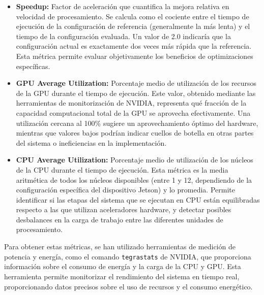 \documentclass[11pt,spanish,listoffigures,listoftables]{tfgetsinf}
\begin{document}
\begin{itemize}
      \item \textbf{Speedup:} Factor de aceleración que cuantifica la mejora relativa en velocidad de procesamiento. Se calcula como el cociente entre el tiempo de ejecución de la configuración de referencia (generalmente la más lenta) y el tiempo de la configuración evaluada. Un valor de 2.0 indicaría que la configuración actual es exactamente dos veces más rápida que la referencia. Esta métrica permite evaluar objetivamente los beneficios de optimizaciones específicas.

      \item \textbf{GPU Average Utilization:} Porcentaje medio de utilización de los recursos de la GPU durante el tiempo de ejecución. Este valor, obtenido mediante las herramientas de monitorización de NVIDIA, representa qué fracción de la capacidad computacional total de la GPU se aprovecha efectivamente. Una utilización cercana al 100\% sugiere un aprovechamiento óptimo del hardware, mientras que valores bajos podrían indicar cuellos de botella en otras partes del sistema o ineficiencias en la implementación.
      
      \item \textbf{CPU Average Utilization:} Porcentaje medio de utilización de los núcleos de la CPU durante el tiempo de ejecución. Esta métrica es la media aritmética de todos los núcleos disponibles (entre 1 y 12, dependiendo de la configuración específica del dispositivo Jetson) y lo promedia. Permite identificar si las etapas del sistema que se ejecutan en CPU están equilibradas respecto a las que utilizan aceleradores hardware, y detectar posibles desbalances en la carga de trabajo entre las diferentes unidades de procesamiento.

\end{itemize}


Para obtener estas métricas, se han utilizado herramientas de medición de potencia y energía, como el comando \texttt{tegrastats} de NVIDIA, que proporciona información sobre el consumo de energía y la carga de la CPU y GPU. Esta herramienta permite monitorizar el rendimiento del sistema en tiempo real, proporcionando datos precisos sobre el uso de recursos y el consumo energético.
\end{document}
